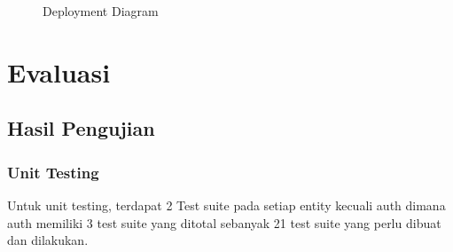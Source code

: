 \begin{figure}[h]
	{\par}
	\caption{Deployment Diagram}
	\label{deployment}
\end{figure}

\newpage

\section{Evaluasi}

\subsection{Hasil Pengujian}
\subsubsection{Unit Testing}
 Untuk unit testing, terdapat 2 Test suite pada setiap entity kecuali auth dimana auth memiliki 3 test suite yang ditotal sebanyak 21 test suite yang perlu dibuat dan dilakukan.

